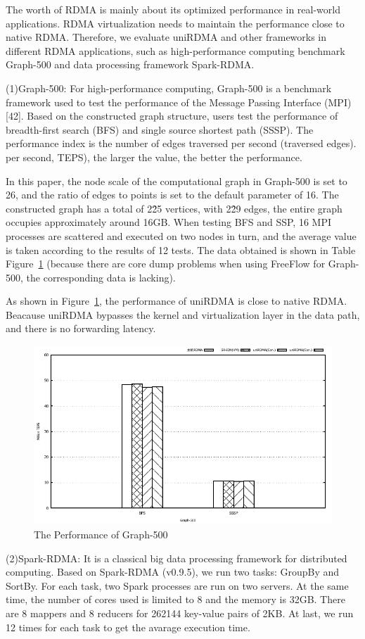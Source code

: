 The worth of RDMA is mainly about its optimized performance in real-world applications. RDMA virtualization needs to maintain the performance close to native RDMA. Therefore, we evaluate uniRDMA and other frameworks in different RDMA applications, such as high-performance computing benchmark Graph-500 and data processing framework Spark-RDMA.

(1)Graph-500: For high-performance computing, Graph-500 is a benchmark framework used to test the performance of the Message Passing Interface (MPI) [42]. Based on the constructed graph structure, users test the performance of breadth-first search (BFS) and single source shortest path (SSSP). The performance index is the number of edges traversed per second (traversed edges). per second, TEPS), the larger the value, the better the performance.

In this paper, the node scale of the computational graph in Graph-500 is set to 26, and the ratio of edges to points is set to the default parameter of 16. The constructed graph has a total of 2\^25 vertices, with 2\^29 edges, the entire graph occupies approximately around 16GB. When testing BFS and SSP, 16 MPI processes are scattered and executed on two nodes in turn, and the average value is taken according to the results of 12 tests. The data obtained is shown in Table Figure~\ref{fig:graph-500} (because there are core dump problems when using FreeFlow for Graph-500, the corresponding data is lacking).

As shown in Figure~\ref{fig:graph-500},  the performance of uniRDMA is close to native RDMA. Beacause uniRDMA bypasses the kernel and virtualization layer in the data path, and there is no forwarding latency.

\begin{figure}[!ht]
	\centering
	\includegraphics[width=1.0\linewidth]{images/graph-500.pdf}
	\caption{The Performance of Graph-500}
	\label{fig:graph-500}
\end{figure}

(2)Spark-RDMA: It is a classical big data processing framework for distributed computing. Based on Spark-RDMA (v0.9.5), we run two tasks: GroupBy and SortBy. For each task, two Spark processes are run on two servers. At the same time, the number of cores used is limited to 8 and the memory is 32GB. There are 8 mappers and 8 reducers for 262144 key-value pairs of 2KB. At last, we run 12 times for each task to get the avarage execution time.